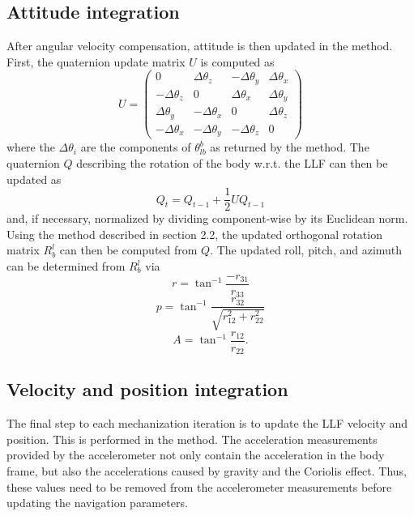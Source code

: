 \documentclass[11pt, oneside]{article}   	%
\begin{document}
\subsection{Attitude integration}
After angular velocity compensation, attitude is then updated in the  method. First, the quaternion update matrix $U$ is computed as
\begin{equation}
U=\begin{pmatrix}
0 & \Delta\theta_z & -\Delta\theta_y & \Delta\theta_x \\
-\Delta\theta_z & 0 & \Delta\theta_x & \Delta\theta_y \\
\Delta\theta_y & -\Delta\theta_x & 0 & \Delta\theta_z \\
-\Delta\theta_x & -\Delta\theta_y & -\Delta\theta_z & 0 
\end{pmatrix}
\end{equation}
where the $\Delta\theta_i$ are the components of $\theta_{lb}^b$ as returned by the  method.  The quaternion $Q$ describing the rotation of the body w.r.t. the LLF can then be updated as
\begin{equation}
Q_t=Q_{t-1}+\frac12UQ_{t-1}
\end{equation}
and, if necessary, normalized by dividing component-wise by its Euclidean norm. Using the method described in section 2.2, the updated orthogonal rotation matrix $R_b^l$ can then be computed from $Q$.
The updated roll, pitch, and azimuth can be determined from $R_b^l$ via 
\begin{equation}
r=\tan^{-1}\frac{-r_{31}}{r_{33}}
\end{equation}
\begin{equation}
p=\tan^{-1}\frac{r_{32}}{\sqrt{r_{12}^2+r_{22}^2}}
\end{equation}
\begin{equation}
A=\tan^{-1}\frac{r_{12}}{r_{22}}.
\end{equation}

\subsection{Velocity and position integration}
The final step to each mechanization iteration is to update the LLF velocity and position.  This is performed in the  method.  
The acceleration measurements provided by the accelerometer not only contain the acceleration in the body frame, but also the accelerations caused by gravity and the Coriolis effect. Thus, these values need to be removed from the accelerometer measurements before updating the navigation parameters.
\end{document}

